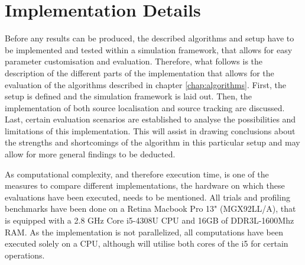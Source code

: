 \chapter{Implementation Details}
\label{chap:implementation}

Before any results can be produced, the described algorithms and setup have to be implemented and tested within a simulation framework, that allows for easy parameter customisation and evaluation. Therefore, what follows is the description of the different parts of the implementation that allows for the evaluation of the algorithms described in chapter \ref{chap:algorithms}. First, the setup is defined and the simulation framework is laid out. Then, the implementation of both source localisation and source tracking are discussed. Last, certain evaluation scenarios are established to analyse the possibilities and limitations of this implementation. This will assist in drawing conclusions about the strengths and shortcomings of the algorithm in this particular setup and may allow for more general findings to be deducted.

As computational complexity, and therefore execution time, is one of the measures to compare different implementations, the hardware on which these evaluations have been executed, needs to be mentioned. All trials and profiling benchmarks have been done on a Retina Macbook Pro 13" (MGX92LL/A), that is equipped with a 2.8 GHz Core i5-4308U CPU and 16GB of DDR3L-1600Mhz RAM. As the implementation is not parallelized, all computations have been executed solely on a CPU, although \matlab will utilise both cores of the i5 for certain operations.
